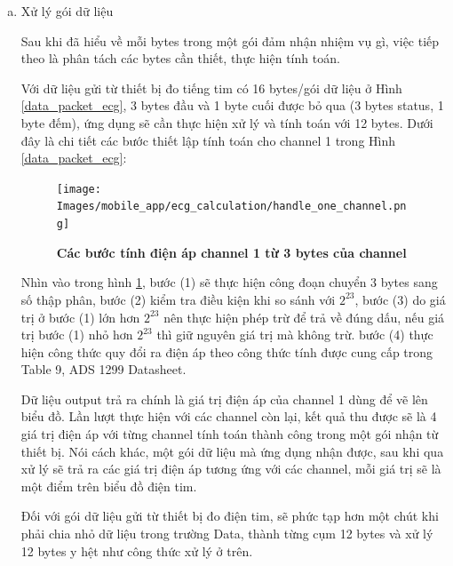 \begin{enumerate} [a)]
    Về cơ bản, 0 - 240 bytes trong trường Data, chính là gộp của nhiều mẫu đo nhỏ, rồi mới gửi qua Bluetooth.
    Sau khi xác định được đủ các yếu tố và hiểu được cấu trúc gói, chúng em sẽ bắt đầu xử lý gói dữ liệu.

  \item Xử lý gói dữ liệu

    Sau khi đã hiểu về mỗi bytes trong một gói đảm nhận nhiệm vụ gì, việc tiếp theo là phân tách các bytes cần thiết,
    thực hiện tính toán. 
    
    Với dữ liệu gửi từ thiết bị đo tiếng tim có 16 bytes/gói dữ liệu ở Hình \ref{data_packet_ecg}, 3 bytes đầu và 1 byte cuối được bỏ qua (3 bytes status, 
    1 byte đếm), ứng dụng sẽ cần thực hiện xử lý và tính toán với 12 bytes. Dưới đây là chi tiết các bước thiết lập tính toán cho channel 1 trong Hình \ref{data_packet_ecg}:

    \begin{figure}[H]
      \centering
      \texttt{[image: Images/mobile\_app/ecg\_calculation/handle\_one\_channel.png]}
      \caption[Các bước tính điện áp channel 1 từ 3 bytes của channel]{\bfseries \fontsize{12pt}{0pt}
      \selectfont Các bước tính điện áp channel 1 từ 3 bytes của channel}
      \label{channel_01_calculation} %
    \end{figure}

    Nhìn vào trong hình \ref{channel_01_calculation}, bước (1) sẽ thực hiện công đoạn chuyển 3 bytes sang số thập phân,
    bước (2) kiểm tra điều kiện khi so sánh với \(2^{23}\), bước (3) do giá trị ở bước (1) lớn hơn \(2^{23}\) nên thực hiện
    phép trừ để trả về đúng dấu, nếu giá trị bước (1) nhỏ hơn \(2^{23}\) thì giữ nguyên giá trị mà không trừ.
    bước (4) thực hiện công thức quy đổi ra điện áp theo công thức tính được cung cấp trong Table 9, ADS 1299
    Datasheet.

    Dữ liệu output trả ra chính là giá trị điện áp của channel 1 dùng để vẽ lên biểu đồ. Lần lượt thực hiện với các channel
    còn lại, kết quả thu được sẽ là 4 giá trị điện áp với từng channel tính toán thành công trong một gói nhận từ thiết bị.
    Nói cách khác, một gói dữ liệu mà ứng dụng nhận được, sau khi qua xử lý sẽ trả ra các giá trị điện áp tương ứng với các
    channel, mỗi giá trị sẽ là một điểm trên biểu đồ điện tim.

    Đối với gói dữ liệu gửi từ thiết bị đo điện tim, sẽ phức tạp hơn một chút khi phải chia nhỏ dữ liệu trong trường Data,
    thành từng cụm 12 bytes và xử lý 12 bytes y hệt như công thức xử lý ở trên. 


\end{enumerate}
